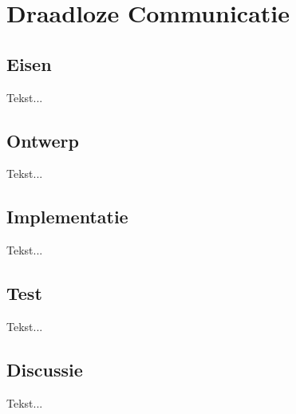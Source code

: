 \chapter[Draadloze Communicatie: XBee Module]{Draadloze Communicatie} \label {chapter:xbee}

	\section{Eisen}
		Tekst...
	\section{Ontwerp}
		Tekst...
	\section{Implementatie}
			Tekst...
	\section{Test}
			Tekst...
	\section{Discussie}
			Tekst...
